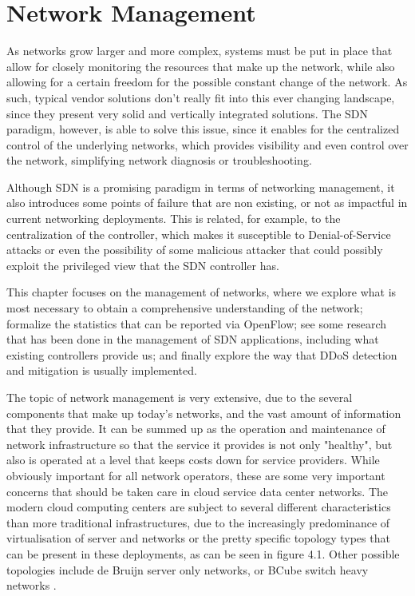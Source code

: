 \chapter{Network Management} \label{chap:nm} %

As networks grow larger and more complex, systems must be put in place that allow for closely monitoring the resources that make up the network, while also allowing for a certain freedom for the possible constant change of the 
network. As such, typical vendor solutions don't really fit into this ever changing landscape, since they present very solid and vertically integrated solutions. The SDN paradigm, however, is able to solve this issue, since it 
enables for the centralized control of the underlying networks, which provides visibility and even control over the network, simplifying network diagnosis or troubleshooting. 
\par Although SDN is a promising paradigm in terms of networking management, it also introduces some points of failure that are non existing, or not as impactful in current networking deployments. This is related, for example,
to the centralization of the controller, which makes it susceptible to Denial-of-Service attacks or even the possibility of some malicious attacker that could possibly exploit the privileged view that the SDN controller has.
\par This chapter focuses on the management of networks, where we explore what is most necessary to obtain a comprehensive understanding of the network; formalize the statistics that can be reported via OpenFlow; see some 
research that has been done in the management of SDN applications, including what existing controllers provide us; and finally explore the way that DDoS detection and mitigation is usually implemented.

\par The topic of network management is very extensive, due to the several components that make up today's networks, and the vast amount of information that they provide. It can be summed up as the operation and maintenance 
of network infrastructure so that the service it provides is not only "healthy", but also is operated at a level that keeps costs down for service providers. While obviously important for all network operators, these are 
some very important concerns that should be taken care in cloud service data center networks. The modern cloud computing centers are subject to several different characteristics than more traditional infrastructures, due to the 
increasingly predominance of virtualisation of server and networks or the pretty specific topology types that can be present in these deployments,  as can be seen in figure 4.1. Other possible topologies include de Bruijn server only
networks, or BCube switch heavy networks \cite{ popa_cost_2010 }.

